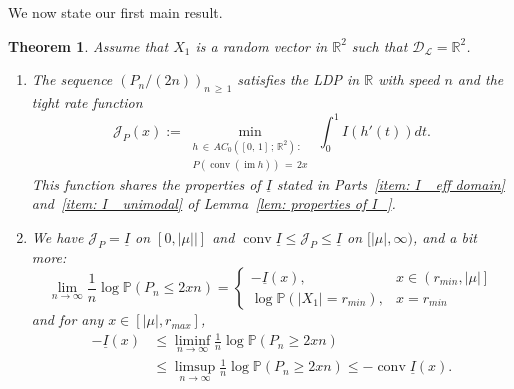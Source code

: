 \documentclass[10pt]{amsart}
\newtheorem{theo}{Theorem}[section]
\theoremstyle{definition}\newtheorem{defi}[theo]{Definition}\newtheorem{rema}[theo]{Remark}\newtheorem{exam}[theo]{Example}\newtheorem{exem}[theo]{Example}\newtheorem{nota}[theo]{Notation}
\DeclareMathOperator{\conv}{conv}
\DeclareMathOperator{\im}{im}
\newcommand{\ubar}[1]{\underline{#1}}
\newcommand{\Rbb}{\mathbb{R}}
\newcommand{\Pbb}{\mathbb{P}}
\newcommand{\Dcl}{\mathcal{D}}
\newcommand{\Lcl}{\mathcal{L}}
\newcommand{\Jcl}{\mathcal{J}}
\begin{document}
We now state our first main result.



\begin{theo} \label{thm: perimeter LD}
Assume that $X_1$ is a random vector in $\Rbb^2$ such that $\Dcl_{\Lcl} = \Rbb^2$.
\begin{enumerate}
\item \label{theo2.3.1} The sequence $(P_n/(2n))_{n\,\ge\,1}$ satisfies the LDP in $\Rbb$ with speed $n$ and the tight rate function
\begin{equation}\label{eq: rate func I_P}
\Jcl_P(x):=\min_{\substack{h\,\in\,AC_0\left([0,\,1]\,;\,\Rbb^2\right)\,: \\ P(\conv(\im h))\,=\,2x }}\,\int_0^1 I(h'(t)) dt.
\end{equation}
This function shares the properties of $\ubar I$ stated in Parts~\eqref{item: I_ eff domain} and~\eqref{item: I_ unimodal} of Lemma~\ref{lem: properties of I_}.

\item\label{theo2.3.2} We have $\Jcl_P = \ubar I$ on $[0, |\mu||]$ and $\conv \ubar I \leqslant \Jcl_P \leqslant \ubar I$ on $[|\mu|, \infty)$, and a bit more:
\begin{equation}\label{eq: LD per < E}
\lim_{n \to \infty} \frac 1n \log \Pbb(P_n \le 2 xn) =
\begin{cases}
-\ubar I(x), & x \in \left(r_{min}, |\mu|\right]\\
\log \Pbb\left(|X_1|=r_{min}\right), & x = r_{min}
\end{cases}
\end{equation}
and for any $x \in [|\mu|, r_{max}]$,
\begin{equation}\label{eq: LD per > E}
\begin{aligned}
-\ubar I (x) &\le \liminf _{n \to \infty} \frac 1n \log \Pbb(P_n \ge 2 xn)\\
&\le \limsup _{n \to \infty} \frac 1n \log \Pbb(P_n \ge 2 xn) \le -\conv \ubar I (x).
\end{aligned}
\end{equation}


\end{enumerate}
\end{theo}
\end{document}
